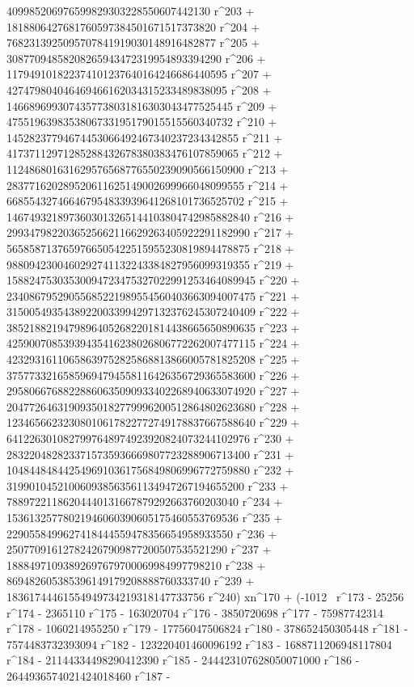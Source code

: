        409985206976599829303228550607442130 r^203 + 
       1818806427681760597384501671517373820 r^204 + 
       7682313925095707841919030148916482877 r^205 + 
       30877094858208265943472319954893394290 r^206 + 
       117949101822374101237640164246686440595 r^207 + 
       427479804046469466162034315233489838095 r^208 + 
       1466896993074357738031816303043477525445 r^209 + 
       4755196398353806733195179015515560340732 r^210 + 
       14528237794674453066492467340237234342855 r^211 + 
       41737112971285288432678380383476107859065 r^212 + 
       112486801631629576568776550239090566150900 r^213 + 
       283771620289520611625149002699966048099555 r^214 + 
       668554327466467954833939641268101736525702 r^215 + 
       1467493218973603013265144103804742985882840 r^216 + 
       2993479822036525662116629263405922291182990 r^217 + 
       5658587137659766505422515955230819894478875 r^218 + 
       9880942300460292741132243384827956099319355 r^219 + 
       15882475303530094723475327022991253464089945 r^220 + 
       23408679529055685221989554560403663094007475 r^221 + 
       31500549354389220033994297132376245307240409 r^222 + 
       38521882194798964052682201814438665650890635 r^223 + 
       42590070853939435416238026806772262007477115 r^224 + 
       42329316110658639752825868813866005781825208 r^225 + 
       37577332165859694794558116426356729365583600 r^226 + 
       29580667688228860635090933402268940633074920 r^227 + 
       20477264631909350182779996200512864802623680 r^228 + 
       12346566232308010617822772749178837667588640 r^229 + 
       6412263010827997648974923920824073244102976 r^230 + 
       2832204828233715735936669807723288906713400 r^231 + 
       1048448484425496910361756849806996772759880 r^232 + 
       319901045210060938563561134947267194655200 r^233 + 
       78897221186204440131667879292663760203040 r^234 + 
       15361325778021946060390605175460553769536 r^235 + 
       2290558499627418444559478356654958933550 r^236 + 
       250770916127824267909877200507535521290 r^237 + 
       18884971093892697679700069984997798210 r^238 + 
       869482605385396149179208888760333740 r^239 + 
       18361744461554949734219318147733756 r^240) xn^170 + (-1012 \
r^173 - 25256 r^174 - 2365110 r^175 - 163020704 r^176 - 
       3850720698 r^177 - 75987742314 r^178 - 1060214955250 r^179 - 
       17756047506824 r^180 - 378652450305448 r^181 - 
       7574483732393094 r^182 - 123220401460096192 r^183 - 
       1688711206948117804 r^184 - 21144334498290412390 r^185 - 
       244423107628050071000 r^186 - 2644936574021424018460 r^187 - 
